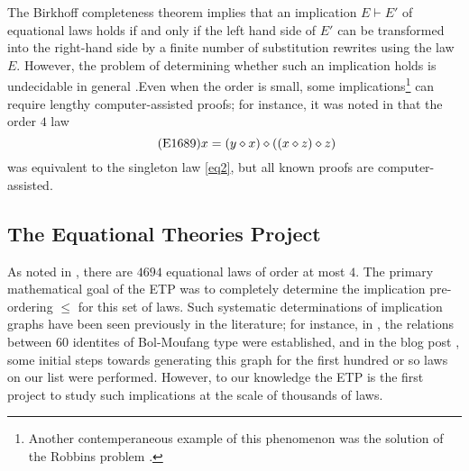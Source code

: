 The Birkhoff completeness theorem \cite[Th. 3.5.14]{term-rewriting} implies that an implication $E \vdash E'$ of equational laws holds if and only if the left hand side of $E'$ can be transformed into the right-hand side by a finite number of substitution rewrites using the law $E$.  However, the problem of determining whether such an implication holds is undecidable in general \cite{mckenzie}.Even when the order is small, some implications\footnote{Another contemperaneous example of this phenomenon was the solution of the Robbins problem \cite{robbins}.} can require lengthy computer-assisted proofs; for instance, it was noted in \cite{Kisielewicz2} that the order $4$ law
\begin{equation}\label{eq1689}\tag{E1689}
    x = (y \diamond x) \diamond ((x \diamond z) \diamond z)
\end{equation}
was equivalent to the singleton law \eqref{eq2}, but all known proofs are computer-assisted.

\subsection{The Equational Theories Project}

As noted in , there are $4694$ equational laws of order at most $4$.  The primary mathematical goal of the ETP was to completely determine the implication pre-ordering $\leq$ for this set of laws.  Such systematic determinations of implication graphs have been seen previously in the literature; for instance, in \cite{phillips-vojtechovsky}, the relations between $60$ identites of Bol-Moufang type were established, and in the blog post \cite[\S 17]{Wolfram_2022}, some initial steps towards generating this graph for the first hundred or so laws on our list were performed.  However, to our knowledge the ETP is the first project to study such implications at the scale of thousands of laws.

